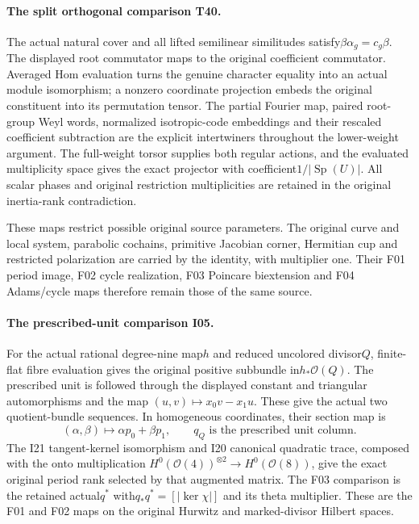 \paragraph{The split orthogonal comparison T40.}
The actual natural cover and all lifted semilinear
similitudes satisfy$\beta\alpha_g=c_g\beta$.
The displayed root commutator maps to the original
coefficient commutator. Averaged Hom evaluation turns
the genuine character equality into an actual module
isomorphism; a nonzero coordinate projection embeds
the original constituent into its permutation tensor.
The partial Fourier map, paired root-group Weyl words,
normalized isotropic-code embeddings and their
rescaled coefficient subtraction are the explicit
intertwiners throughout the lower-weight argument.
The full-weight torsor supplies both regular actions,
and the evaluated multiplicity space gives the exact
projector with coefficient$1/|\operatorname{Sp}(U)|$.
All scalar phases and original restriction multiplicities
are retained in the original inertia-rank contradiction.

These maps restrict possible original source parameters.
The original curve and local system, parabolic cochains,
primitive Jacobian corner, Hermitian cup and restricted
polarization are carried by the identity, with multiplier
one. Their F01 period image, F02 cycle realization,
F03 Poincare biextension and F04 Adams/cycle maps
therefore remain those of the same source.

\paragraph{The prescribed-unit comparison I05.}
For the actual rational degree-nine map$h$ and reduced
uncolored divisor$Q$, finite-flat fibre evaluation gives
the original positive subbundle in$h_*\mathcal O(Q)$.
The prescribed unit is followed through the displayed
constant and triangular automorphisms and the map
$(u,v)\mapsto x_0v-x_1u$. These give the actual two
quotient-bundle sequences. In homogeneous coordinates,
their section map is
\[
 (\alpha,\beta)\longmapsto\alpha p_0+\beta p_1,
 \qquad q_Q\text{ is the prescribed unit column}.
\]
The I21 tangent-kernel isomorphism and I20 canonical
quadratic trace, composed with the onto multiplication
$H^0(\mathcal O(4))^{\otimes2}\to H^0(\mathcal O(8))$,
give the exact original period rank selected by that
augmented matrix. The F03 comparison is the retained
actual$q^*$ with$q_*q^*=[|\ker\chi|]$ and its theta
multiplier. These are the F01 and F02 maps on the
original Hurwitz and marked-divisor Hilbert spaces.

